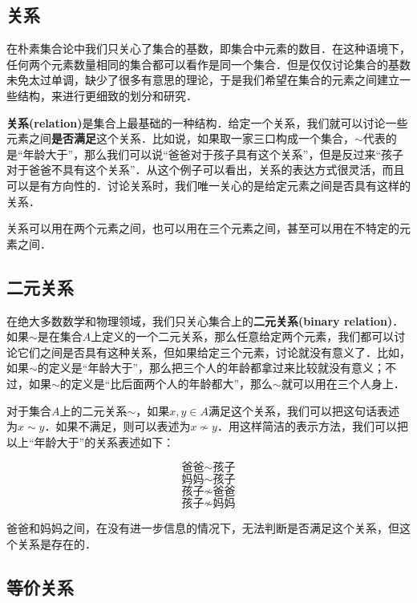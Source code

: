 \subsection{关系}

在朴素集合论中我们只关心了集合的基数，即集合中元素的数目．在这种语境下，任何两个元素数量相同的集合都可以看作是同一个集合．但是仅仅讨论集合的基数未免太过单调，缺少了很多有意思的理论，于是我们希望在集合的元素之间建立一些结构，来进行更细致的划分和研究．

\textbf{关系(relation)}是集合上最基础的一种结构．给定一个关系，我们就可以讨论一些元素之间\textbf{是否满足}这个关系．比如说，如果取一家三口构成一个集合，$\sim$代表的是“年龄大于”，那么我们可以说“爸爸对于孩子具有这个关系”，但是反过来“孩子对于爸爸不具有这个关系”．从这个例子可以看出，关系的表达方式很灵活，而且可以是有方向性的．讨论关系时，我们唯一关心的是给定元素之间是否具有这样的关系．

关系可以用在两个元素之间，也可以用在三个元素之间，甚至可以用在不特定的元素之间．

\subsection{二元关系}

在绝大多数数学和物理领域，我们只关心集合上的\textbf{二元关系(binary relation)}．如果$\sim$是在集合$A$上定义的一个二元关系，那么任意给定两个元素，我们都可以讨论它们之间是否具有这种关系，但如果给定三个元素，讨论就没有意义了．比如，如果$\sim$的定义是“年龄大于”，那么把三个人的年龄都拿过来比较就没有意义；不过，如果$\sim$的定义是“比后面两个人的年龄都大”，那么$\sim$就可以用在三个人身上．

对于集合$A$上的二元关系$\sim$，如果$x, y\in A$满足这个关系，我们可以把这句话表述为$x\sim y$．如果不满足，则可以表述为$x\not\sim y$．用这样简洁的表示方法，我们可以把以上“年龄大于”的关系表述如下：

$$\text{爸爸}\sim\text{孩子}$$ $$\text{妈妈}\sim\text{孩子}$$ $$\text{孩子}\not\sim\text{爸爸}$$ $$\text{孩子}\not\sim\text{妈妈}$$

爸爸和妈妈之间，在没有进一步信息的情况下，无法判断是否满足这个关系，但这个关系是存在的．



\subsection{等价关系}

